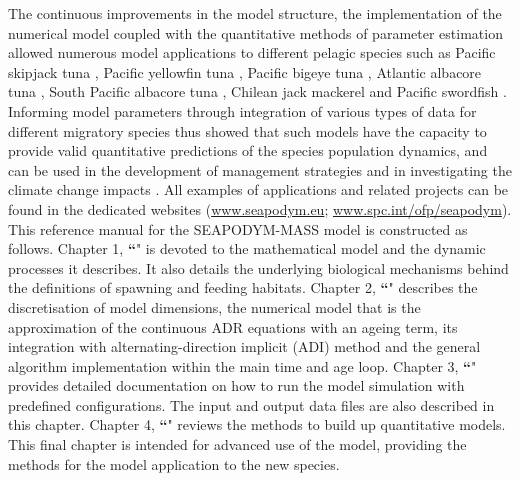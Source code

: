 The continuous improvements in the model structure, the implementation of the numerical model coupled with the quantitative methods of parameter estimation allowed numerous model applications to different pelagic species such as Pacific skipjack tuna \citep{Lehodey2013,Senina20b}, Pacific yellowfin tuna \citep{Senina2015}, Pacific bigeye tuna \citep{Senina2021}, Atlantic albacore tuna \citep{Dragon2015,Senina20a}, South Pacific albacore tuna \citep{Lehodey2015,Senina20a}, Chilean jack mackerel \citep{Dragon2017} and Pacific swordfish \citep{Abecassis}. Informing model parameters through integration of various types of data for different migratory species thus showed that such models have the capacity to provide valid quantitative predictions of the species population dynamics, and can be used in the development of management strategies \citep{Sibert2012} and in investigating the climate change impacts \citep{Lehodey2010,Lehodey2013,Lehodey2015,Bell}. All examples of applications and related projects can be found in the dedicated websites (\url{www.seapodym.eu}; \url{www.spc.int/ofp/seapodym}).\\

This reference manual for the SEAPODYM-MASS model is constructed as follows. {\hypersetup{linkcolor=black} Chapter 1, {\bfseries ``}"} is devoted to the mathematical model and the dynamic processes it describes. It also details the underlying biological mechanisms behind the definitions of spawning and feeding habitats. {\hypersetup{linkcolor=black} Chapter 2, {\bfseries ``}"} describes the discretisation of model dimensions, the numerical model that is the approximation of the continuous ADR equations with an ageing term, its integration with alternating-direction implicit (ADI) method and the general algorithm implementation within the main time and age loop. {\hypersetup{linkcolor=black} Chapter 3, {\bfseries ``}"} provides detailed documentation on how to run the model simulation with predefined configurations. The input and output data files are also described in this chapter. {\hypersetup{linkcolor=black} Chapter 4, {\bfseries ``}"} reviews the methods to build up quantitative models. This final chapter is intended for advanced use of the model, providing the methods for the model application to the new species.

\setcounter{figure}{0}
\renewcommand{\thefigure}{\arabic{chapter}.\arabic{figure}}




